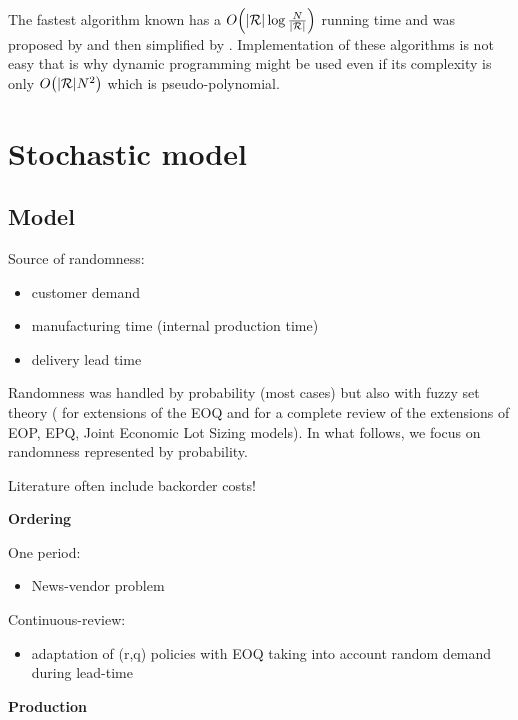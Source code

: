 The fastest algorithm known has a $O\bracket{\card{\REF}\log{\frac{\nbsetups}{\card{\REF}}}}$ running time and was proposed by \cite{Frederickson1982} and then simplified by \cite{Hochbaum1994}. Implementation of these algorithms is not easy that is why dynamic programming might be used even if its complexity is only $O\bracket{\card{\REF}\nbsetups^2}$ which is pseudo-polynomial.



\section{Stochastic model}


\subsection{Model}

Source of randomness:
\begin{itemize}
  \item customer demand
  \item manufacturing time (internal production time)
  \item delivery lead time
\end{itemize}

Randomness was handled by probability (most cases) but also with fuzzy set theory (\eg \cite{Park1987,Lee1999,Wang2007} for extensions of the EOQ and \cite{Ziukov2015} for a complete review of the extensions of EOP, EPQ, Joint Economic Lot Sizing models). In what follows, we focus on randomness represented by probability.

Literature often include backorder costs!

\medskip

\textbf{Ordering}

One period:
\begin{itemize}
  \item News-vendor problem \cite{Edgeworth88,Arrow1951}
\end{itemize}

Continuous-review:
\begin{itemize}
  \item adaptation of (r,q) policies with EOQ taking into account random demand during lead-time \cite{Gallego1998}
\end{itemize}

\medskip

\textbf{Production}




